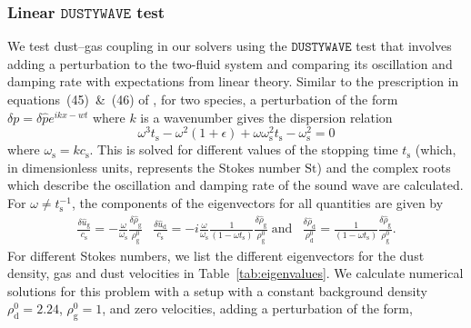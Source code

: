\documentclass[fleqn,usenatbib,useAMS]{mnras}
\newcommand{\cs}{c_\mathrm{s}}
\newcommand{\St}{\mathrm{St}}
\newcommand{\ts}{t_\mathrm{s}}
\newcommand{\dw}{\texttt{DUSTYWAVE}}
\begin{document}
\subsubsection{Linear $\dw{}$ test}
\label{sub:linear-dw-test}

We test dust--gas coupling in our solvers using the $\dw{}$ test \citep{laibe-price-2011, laibe-price-2012} that involves adding a perturbation to the two-fluid system and comparing its oscillation and damping rate with expectations from linear theory. Similar to the prescription in equations~(45)~\&~(46) of \citet{benitez-etal-2019}, for two species, a perturbation of the form $\delta p = \delta \hat{p} e^{ikx - wt}$ where $k$ is a wavenumber gives the dispersion relation
\begin{equation}
    \omega^3 \ts - \omega^2 (1 + \epsilon) + \omega \omega_\text{s}^2 \ts - \omega_\text{s}^2 = 0
\end{equation}
where $\omega_\text{s} = k \cs$. This is solved for different values of the stopping time $\ts$ (which, in dimensionless units, represents the Stokes number $\St$) and the complex roots which describe the oscillation and damping rate of the sound wave are calculated. For $\omega \neq \ts^{-1}$, the components of the eigenvectors for all quantities are given by
\begin{subequations}
	\label{eq:eigenvectors}
	\begin{align}
		\label{eq:velg}
  \frac{\delta \hat{u}_\text{g}}{\cs} = - \frac{\omega}{\omega_\text{s}} \frac{\delta \hat{\rho}_\text{g}}{\rho_\text{g}^0}
         \end{align}
         \begin{align}
		\label{eq:veld}
  \frac{\delta \hat{u}_\text{d}}{\cs} = - i \frac{\omega}{\omega_\text{s}} \frac{1}{(1 - \omega \ts)} \frac{\delta \hat{\rho}_\text{g}}{\rho_\text{g}^0} \; \text{and}
         \end{align}
         \begin{align}
		\label{eq:rhod}
  \frac{\delta \hat{\rho}_\text{d}}{\rho_\text{d}^0} =  \frac{1}{(1 - \omega \ts)} \frac{\delta \hat{\rho}_\text{g}}{\rho_\text{g}^0} .  \end{align}
\end{subequations}
For different Stokes numbers, we list the different eigenvectors for the dust density, gas and dust velocities in Table~\ref{tab:eigenvalues}.
We calculate numerical solutions for this problem with a setup with a constant background density $\rho_\text{d}^0 = 2.24$, $\rho_\text{g}^0 = 1$, and zero velocities, adding a perturbation of the form,
\end{document}
